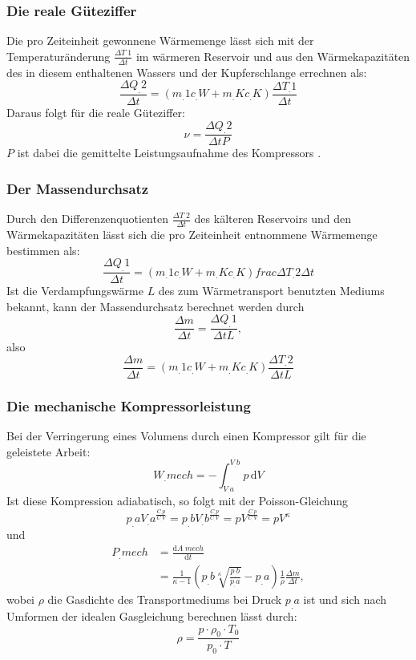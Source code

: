 \subsubsection{Die reale Güteziffer}
Die pro Zeiteinheit gewonnene Wärmemenge lässt sich mit der Temperaturänderung $\frac{\Delta T_.{1}}{\Delta t}$ im wärmeren Reservoir und aus den Wärmekapazitäten des in diesem enthaltenen Wassers und der Kupferschlange errechnen als\cite{V206}:
\begin{equation}
\frac{\Delta Q_.{2}}{\Delta t}=(m_.{1}c_.{W} +m_.{K}c_.{K})\frac{\Delta T_.{1}}{\Delta t}\label{eq:Q2/dt}
\end{equation}
Daraus folgt für die reale Güteziffer:
\begin{equation}
\nu = \frac{\Delta Q_.{2}}{\Delta t P}\label{eq:ny}
\end{equation}
$P$ ist dabei die gemittelte Leistungsaufnahme des Kompressors \cite{V206}.
\subsubsection{Der Massendurchsatz}
Durch den Differenzenquotienten $\frac{\Delta T_.{2}}{\Delta t}$
des kälteren Reservoirs und den Wärmekapazitäten lässt sich die pro Zeiteinheit entnommene Wärmemenge bestimmen als\cite{V206}:
\[\frac{\Delta Q_.{1}}{\Delta t}=(m_.{1}c_.{W} +m_.{K}c_.{K})frac{\Delta T_.{2}}{\Delta t}\]
Ist die Verdampfungswärme $L$ des zum Wärmetransport benutzten Mediums bekannt, kann der Massendurchsatz berechnet werden durch
\begin{equation*}
\frac{\Delta m}{\Delta t} = \frac{\Delta Q_.{1}}{\Delta t L},\label{eq:Md1}
\end{equation*}
also
\begin{equation}
\frac{\Delta m}{\Delta t} = (m_.{1}c_.{W} +m_.{K}c_.{K})\frac{\Delta T_.{2}}{\Delta t L} \label{eq:Md2}
\end{equation}
\subsubsection{Die mechanische Kompressorleistung}
Bei der Verringerung eines Volumens durch einen Kompressor gilt für die geleistete Arbeit:
\[W_.{mech}= - \int_{V_.{a}}^{V_.{b}} p\,\mathrm{d}V\]
Ist diese Kompression adiabatisch, so folgt mit der Poisson-Gleichung
\[p_.{a}V_.{a}^{\frac{C_.{p}}{C_.{V}}} = p_.{b}V_.{b}^{\frac{C_.{p}}{C_.{V}}} = pV^{\frac{C_.{p}}{C_.{V}}} =pV^{\kappa}\]
und
\begin{align}
P_.{mech} 	&= \frac{\mathrm{d}A_.{mech}}{\mathrm{d}t} \nonumber\\
		&= \frac{1}{\kappa - 1}\left(p_.{b}\sqrt[\kappa]{\frac{p_.{b}}{p_.{a}}} - p_.{a}\right)\frac{1}{\rho}\frac{\Delta m}{\Delta t},\label{eq:P}
\end{align}
wobei $\rho$ die Gasdichte des Transportmediums bei Druck $p_.{a}$ ist und sich nach Umformen der idealen Gasgleichung berechnen lässt durch:
\begin{equation}
	\rho = \frac{p\cdot \rho_0\cdot T_0}{p_0\cdot T}\label{eq:rho}
\end{equation}